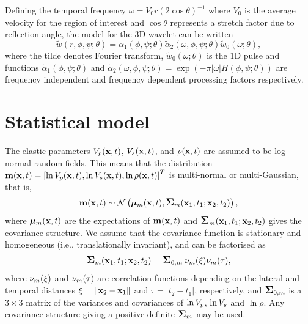 Defining the temporal frequency $\omega = V_0r(2\cos{\theta})^{-1}$
where $V_0$ is the average velocity for the region of interest and
$\cos{\theta}$ represents a stretch factor due to reflection angle,
the model for the 3D wavelet can be written
\begin{equation}
  \tilde{w}(r,\phi,\psi;\theta) 
  = \alpha_1(\phi,\psi;\theta)
    \tilde{\alpha}_2(\omega,\phi,\psi;\theta)
    \tilde{w}_0\left(\omega;\theta\right), \label{eq:waveletform}
\end{equation}
where the tilde denotes Fourier transform,
$\tilde{w}_0(\omega;\theta)$ is the 1D pulse and functions
$\tilde{\alpha}_1(\phi,\psi;\theta)$ and
$\tilde{\alpha}_2(\omega,\phi,\psi;\theta) = \exp(-\pi |\omega|
H(\phi,\psi;\theta))$ are frequency independent and frequency
dependent processing factors respectively.

\section{Statistical model}
\label{sec:statmodthe}
The elastic parameters $V_p(\mathbf{x},t)$, $V_s(\mathbf{x},t)$, and
$\rho(\mathbf{x},t)$ are assumed to be log-normal random
fields. This means that the distribution $\mathbf{m}(\mathbf{x},t) =
\left[\ln V_p(\mathbf{x},t),\ln V_s(\mathbf{x},t),\ln\rho(\mathbf{x},t)\right]^T$
is multi-normal or multi-Gaussian, that is,
%
\begin{equation}
  \mathbf{m}(\mathbf{x},t) \sim
  \mathcal{N}\left(\bm\mu_m(\mathbf{x},t),\mbox{\large\ensuremath{\boldsymbol{\Sigma}}}_m(\mathbf{x}_1,t_1;\mathbf{x}_2,t_2)\right),
\label{mdist}
\end{equation}
%
where $\bm\mu_m(\mathbf{x},t)$ are the expectations of
$\mathbf{m}(\mathbf{x},t)$ and $\mbox{\large\ensuremath{\boldsymbol{\Sigma}}}_m(\mathbf{x}_1,t_1;\mathbf{x}_2,t_2)$
gives the covariance structure. We assume that the covariance function
is stationary and homogeneous (i.e., translationally invariant), and
can be factorised as
%
\begin{equation}
  \mbox{\large\ensuremath{\boldsymbol{\Sigma}}}_m(\mathbf{x}_1,t_1;\mathbf{x}_2,t_2)
    = \mbox{\large\ensuremath{\boldsymbol{\Sigma}}}_{0,m} \: \nu_m(\xi) \nu_m(\tau), \label{sigma_m}
\end{equation}
%
where $\nu_m(\xi)$ and $\nu_m(\tau)$ are correlation functions
depending on the lateral and temporal distances
$\xi = \|\mathbf{x}_2 - \mathbf{x}_1\|$ and $\tau=|t_2-t_1|$,
respectively, and $\mbox{\large\ensuremath{\boldsymbol{\Sigma}}}_{0,m}$ is a $3\times 3$ matrix of the
variances and covariances of $\ln V_p$, $\ln V_s$ and $\ln\rho$. Any
covariance structure giving a positive definite $\mbox{\large\ensuremath{\boldsymbol{\Sigma}}}_m$ may be
used. 

